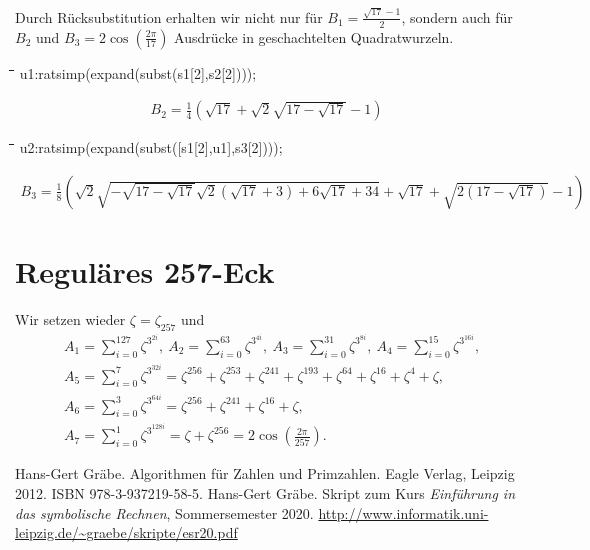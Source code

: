 \documentclass[11pt]{article}
\newcommand{\br}[1]{\ensuremath{\left(#1\right)}}
\newenvironment{code}{\tt \begin{tabbing}
\hskip12pt\=\hskip12pt\=\hskip12pt\=\hskip12pt\=\hskip5cm\=\hskip5cm\=\kill}
{\end{tabbing}}
\begin{document}
Durch Rücksubstitution erhalten wir nicht nur für $B_1=\frac{\sqrt{17}-1}{2}$,
sondern auch für $B_2$ und $B_3=2\cos\br{\frac{2\pi}{17}}$ Ausdrücke in
geschachtelten Quadratwurzeln.
\begin{code}  
u1:ratsimp(expand(subst(s1[2],s2[2])));
\end{code}
\begin{gather*}
  B_2 = \frac14\br{\sqrt{17}+\sqrt{2}\sqrt{17-\sqrt{17}}-1} 
\end{gather*}
\begin{code}  
u2:ratsimp(expand(subst([s1[2],u1],s3[2])));
\end{code}
\begin{gather*}
  B_3 =\frac18\br{\sqrt{2}\sqrt{-\sqrt{17-\sqrt{17}}\sqrt{2}\br{\sqrt{17}+3}
      +6\sqrt{17}+34}
    +\sqrt{17}+\sqrt{2\br{17-\sqrt{17}}}-1}
\end{gather*}

\section{Reguläres 257-Eck}

Wir setzen wieder $\zeta=\zeta_{257}$ und 
\begin{align*}
  &A_1=\sum_{i=0}^{127}{\zeta^{3^{2i}}},\
  A_2=\sum_{i=0}^{63}{\zeta^{3^{4i}}},\
  A_3=\sum_{i=0}^{31}{\zeta^{3^{8i}}},\
  A_4=\sum_{i=0}^{15}{\zeta^{3^{16i}}},\\
  &A_5=\sum_{i=0}^{7}{\zeta^{3^{32i}}}=\zeta^{256}+\zeta^{253}+\zeta^{241}
  +\zeta^{193}+\zeta^{64}+\zeta^{16}+\zeta^4+\zeta,\\
  & A_6=\sum_{i=0}^{3}{\zeta^{3^{64i}}}=\zeta^{256}+\zeta^{241}+\zeta^{16}+\zeta,\\
  &A_7=\sum_{i=0}^1{\zeta^{3^{128i}}}=\zeta+\zeta^{256}=2\cos\br{\frac{2\pi}{257}}.
\end{align*}


\begin{thebibliography}{xxx}
 Hans-Gert Gräbe. Algorithmen für Zahlen und Primzahlen.
  Eagle Verlag, Leipzig 2012. ISBN 978-3-937219-58-5. 
\bibitem{Graebe2020} Hans-Gert Gräbe.  Skript zum Kurs \emph{Einführung in das
  symbolische Rechnen}, Sommersemester 2020.
  \url{http://www.informatik.uni-leipzig.de/~graebe/skripte/esr20.pdf}
\end{thebibliography}
\end{document}
